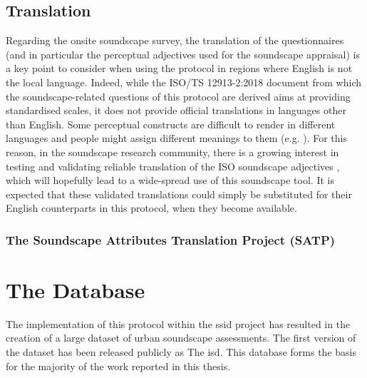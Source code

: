  \subsection{Translation}

   Regarding the onsite soundscape survey, the translation of the questionnaires (and in particular the perceptual adjectives used for the soundscape appraisal) is a key point to consider when using the protocol in regions where English is not the local language. Indeed, while the ISO/TS 12913-2:2018 document from which the soundscape-related questions of this protocol are derived aims at providing standardised scales, it does not provide official translations in languages other than English. Some perceptual constructs are difficult to render in different languages and people might assign different meanings to them (e.g. \citep{Tarlao2016Comparing,Jeon2018cross,Nagahata2019Examination,AlmagroPastor2019Soundscape}). For this reason, in the soundscape research community, there is a growing interest in testing and validating reliable translation of the ISO soundscape adjectives \citep{Aletta2020Soundscape}, which will hopefully lead to a wide-spread use of this soundscape tool. It is expected that these validated translations could simply be substituted for their English counterparts in this protocol, when they become available.
   
   \subsubsection*{The Soundscape Attributes Translation Project (SATP)}

\section{The Database} 

The implementation of this protocol within the \gls{ssid} project has resulted in the creation of a large dataset of urban soundscape assessments. The first version of the dataset has been released publicly as The \gls{isd}. This database forms the basis for the majority of the work reported in this thesis.



